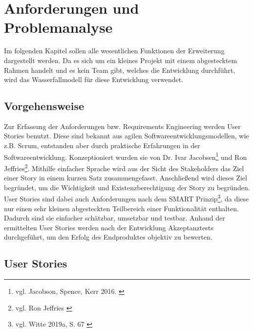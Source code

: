 \chapter{Anforderungen und Problemanalyse}
\label{ch:anforderungen}

Im folgenden Kapitel sollen alle wesentlichen Funktionen der Erweiterung dargestellt werden. Da es sich um ein kleines Projekt mit einem abgestecktem Rahmen handelt und es kein Team gibt, welches die Entwicklung durchführt, wird das Wasserfallmodell für diese Entwicklung verwendet.


\section{Vorgehensweise}

Zur Erfassung der Anforderungen bzw. Requirements Engineering werden User Stories benutzt. Diese sind bekannt aus agilen Softwareentwicklungsmodellen, wie z.B. Scrum, entstanden aber durch praktische Erfahrungen in der Softwareentwicklung.
Konzeptioniert wurden sie von Dr. Ivar Jacobsen\footnote{vgl. Jacobson, Spence, Kerr 2016. \cite{jacobsonUseCaseHubSoftware2016}} und Ron Jeffries\footnote{vgl. Ron Jeffries \cite{jeffriesEssentialXPCard2022}}.
Mithilfe einfacher Sprache wird aus der Sicht des Stakeholders das Ziel einer Story in einem kurzen Satz zusammengefasst.
Anschließend wird dieses Ziel begründet, um die Wichtigkeit und Existenzberechtigung der Story zu begründen.
User Stories sind dabei auch Anforderungen nach dem SMART Prinzip\footnote{vgl. Witte 2019a, S. 67 \cite{witteTestmanagementUndSoftwaretest2016}}, da diese nur einen sehr kleinen abgesteckten Teilbereich einer Funktionalität enthalten.
Dadurch sind sie einfacher schätzbar, umsetzbar und testbar.
Anhand der ermittelten User Stories werden nach der Entwicklung Akzeptanztests durchgeführt, um den Erfolg des Endproduktes objektiv zu bewerten.

\section{User Stories}

